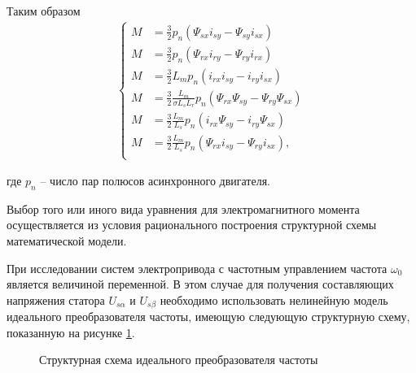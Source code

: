         Таким образом%
%        
        \begin{gather*}
            \left\{
            \begin{aligned}
                M & =\frac{3}{2}p_n(\Psi_{sx}i_{sy}-\Psi_{sy}i_{sx})\\
                M & =\frac{3}{2}p_n(\Psi_{rx}i_{ry}-\Psi_{ry}i_{rx})\\
                M & =\frac{3}{2}L_m p_n(i_{rx}i_{sy}-i_{ry}i_{sx})\\
                M & =\frac{3}{2}\frac{L_m}{\sigma L_s L_r}
                      p_n(\Psi_{rx}\Psi_{sy}-\Psi_{ry}\Psi_{sx})\\
                M & =\frac{3}{2}\frac{L_m}{L_s}
                      p_n(i_{rx}\Psi_{sy}-i_{ry}\Psi_{sx})\\
                M & =\frac{3}{2}\frac{L_m}{L_s}
                    p_n(\Psi_{rx}i_{sy}-\Psi_{ry}i_{sx}),\\
            \end{aligned}
            \right.
        \end{gather*}
        
        где $p_n$ -- число пар полюсов асинхронного двигателя.

        Выбор того или иного вида уравнения для электромагнитного момента
        осуществляется из условия рационального построения структурной схемы
        математической модели.

        При исследовании систем электропривода с частотным управлением частота
        $\omega_0$ является  величиной переменной. В этом случае для получения
        составляющих напряжения статора $U_{s\alpha}$ и $U_{s\beta}$ необходимо
        использовать нелинейную модель идеального преобразователя частоты,
        имеющую следующую структурную схему, показанную на рисунке
        \ref{fig:inv-struct}.

        \begin{figure}[h!]
            \caption{Структурная схема идеального преобразователя частоты}
            \label{fig:inv-struct}
        \end{figure}

